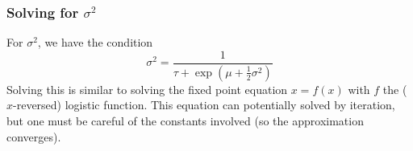 \documentclass[11pt]{article}
\begin{document}
\subsubsection{Solving for $\sigma^2$}
For $\sigma^2$, we have the condition
\begin{equation}
    \sigma^2 = \frac{1}{\tau + \exp\left(\mu + \frac{1}{2}\sigma^2 \right)}
\end{equation}
Solving this is similar to solving the fixed point equation $x = f(x)$ with $f$ the ($x$-reversed) logistic function. This equation can potentially solved by iteration, but one must be careful of the constants involved (so the approximation converges).
\end{document}

